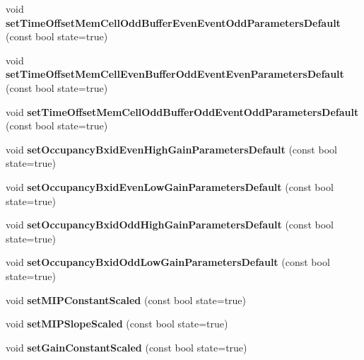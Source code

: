 \begin{DoxyCompactItemize}
\item 
void {\bfseries set\-Time\-Offset\-Mem\-Cell\-Odd\-Buffer\-Even\-Event\-Odd\-Parameters\-Default} (const bool state=true)\label{classCALICE_1_1Ahc2CalibrationStatusBits_a0569988993b5e4fcfe117d9bd3f53481}

\item 
void {\bfseries set\-Time\-Offset\-Mem\-Cell\-Even\-Buffer\-Odd\-Event\-Even\-Parameters\-Default} (const bool state=true)\label{classCALICE_1_1Ahc2CalibrationStatusBits_a2731a934de734be7281e2eb2d2ceffb1}

\item 
void {\bfseries set\-Time\-Offset\-Mem\-Cell\-Odd\-Buffer\-Odd\-Event\-Odd\-Parameters\-Default} (const bool state=true)\label{classCALICE_1_1Ahc2CalibrationStatusBits_a694933ed78c4571c849c97224cfb19c3}

\item 
void {\bfseries set\-Occupancy\-Bxid\-Even\-High\-Gain\-Parameters\-Default} (const bool state=true)\label{classCALICE_1_1Ahc2CalibrationStatusBits_a9fdd3b006fe62f23a8f19b235b72c24c}

\item 
void {\bfseries set\-Occupancy\-Bxid\-Even\-Low\-Gain\-Parameters\-Default} (const bool state=true)\label{classCALICE_1_1Ahc2CalibrationStatusBits_aeafe638ce0901fca25926fb6968ee0af}

\item 
void {\bfseries set\-Occupancy\-Bxid\-Odd\-High\-Gain\-Parameters\-Default} (const bool state=true)\label{classCALICE_1_1Ahc2CalibrationStatusBits_a4b5f518bd09d8aeac7060bffcf1ad24e}

\item 
void {\bfseries set\-Occupancy\-Bxid\-Odd\-Low\-Gain\-Parameters\-Default} (const bool state=true)\label{classCALICE_1_1Ahc2CalibrationStatusBits_a75582cc26346cad5f37843dbade6cafa}

\item 
void {\bfseries set\-M\-I\-P\-Constant\-Scaled} (const bool state=true)\label{classCALICE_1_1Ahc2CalibrationStatusBits_a7b90ee374016c59fe0931a1e42840941}

\item 
void {\bfseries set\-M\-I\-P\-Slope\-Scaled} (const bool state=true)\label{classCALICE_1_1Ahc2CalibrationStatusBits_a2e2221cf01d5766f3f3ff1d66fc9364a}

\item 
void {\bfseries set\-Gain\-Constant\-Scaled} (const bool state=true)\label{classCALICE_1_1Ahc2CalibrationStatusBits_ae6dcfafd7074e5915ae7adb2e7c2101d}


\end{DoxyCompactItemize}
